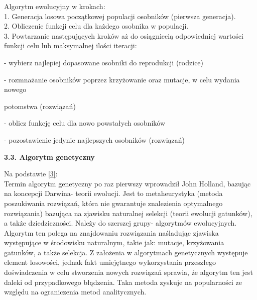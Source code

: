 \documentclass[a4paper, twoside, 12pt, justified]{article}
\begin{document}
	Algorytm ewolucyjny w krokach:\\
	1. Generacja losowa początkowej populacji osobników (pierwsza generacja).\\
	2. Obliczenie funkcji celu dla każdego osobnika w populacji.\\
	3. Powtarzanie następujących kroków aż do osiągniecią odpowiedniej wartości funkcji celu lub maksymalnej ilości iteracji:
	
	\hspace{5mm}- wybierz najlepiej dopasowane osobniki do reprodukcji (rodzice)
	
	\hspace{5mm}- rozmnażanie osobników poprzez krzyżowanie oraz mutacje, w celu wydania nowego 
	
	\hspace{6mm} potomstwa (rozwiązań)
	
	\hspace{5mm}- oblicz funkcję celu dla nowo powstałych osobników
	
	\hspace{5mm}- pozostawienie jedynie najlepszych osobników (rozwiązań)\\
	
	\newpage
	
	\begin{flushleft}
		\begin{large}
			\textbf{3.3. Algorytm genetyczny}
		\end{large}
	\end{flushleft}
	\vspace{5mm} %
	
	Na podstawie \hyperlink{ag}{[3]}:\\
	Termin algorytm genetyczny po raz pierwszy wprowadził John Holland, bazując na koncepcji Darwina- teorii ewolucji. Jest to metaheurystyka (metoda poszukiwania rozwiązań, która nie gwarantuje znalezienia optymalnego rozwiązania) bazująca na zjawisku naturalnej selekcji (teorii ewolucji gatunków), a także dziedziczności. Należy do szerszej grupy- algorytmów ewolucyjnych. Algorytm ten polega na znajdowaniu rozwiązania naśladując zjawiska występujące w środowisku naturalnym, takie jak: mutacje, krzyżowania gatunków, a także selekcja. Z założenia w algorytmach genetycznych występuje element losowości, jednak fakt umiejętnego wykorzystania przeszłego doświadczenia w celu stworzenia nowych rozwiązań sprawia, że algorytm ten jest daleki od przypadkowego błądzenia. Taka metoda zyskuje na popularności ze względu na ograniczenia metod analitycznych.\\
	
\end{document}
